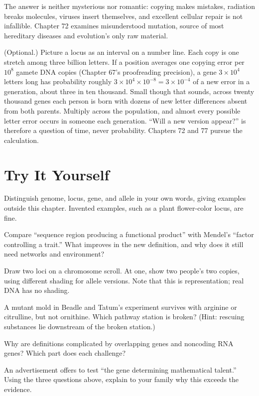 The answer is neither mysterious nor romantic: copying makes mistakes, radiation breaks molecules, viruses insert themselves, and excellent cellular repair is not infallible. Chapter 72 examines misunderstood mutation, source of most hereditary diseases and evolution's only raw material.

\begin{tiaozhan}
(Optional.) Picture a locus as an interval on a number line. Each copy is one stretch among three billion letters. If a position averages one copying error per $10^{8}$ gamete DNA copies (Chapter 67's proofreading precision), a gene $3\times 10^{4}$ letters long has probability roughly $3\times 10^{4}\times 10^{-8}=3\times 10^{-4}$ of a new error in a generation, about three in ten thousand. Small though that sounds, across twenty thousand genes each person is born with dozens of new letter differences absent from both parents. Multiply across the population, and almost every possible letter error occurs in someone each generation. ``Will a new version appear?'' is therefore a question of time, never probability. Chapters 72 and 77 pursue the calculation.
\end{tiaozhan}

\section*{Try It Yourself}

\begin{sikaoti}
\item Distinguish genome, locus, gene, and allele in your own words, giving examples outside this chapter. Invented examples, such as a plant flower-color locus, are fine.
\item Compare ``sequence region producing a functional product'' with Mendel's ``factor controlling a trait.'' What improves in the new definition, and why does it still need networks and environment?
\item Draw two loci on a chromosome scroll. At one, show two people's two copies, using different shading for allele versions. Note that this is representation; real DNA has no shading.
\item A mutant mold in Beadle and Tatum's experiment survives with arginine or citrulline, but not ornithine. Which pathway station is broken? (Hint: rescuing substances lie downstream of the broken station.)
\item Why are definitions complicated by overlapping genes and noncoding RNA genes? Which part does each challenge?
\item An advertisement offers to test ``the gene determining mathematical talent.'' Using the three questions above, explain to your family why this exceeds the evidence.
\end{sikaoti}
